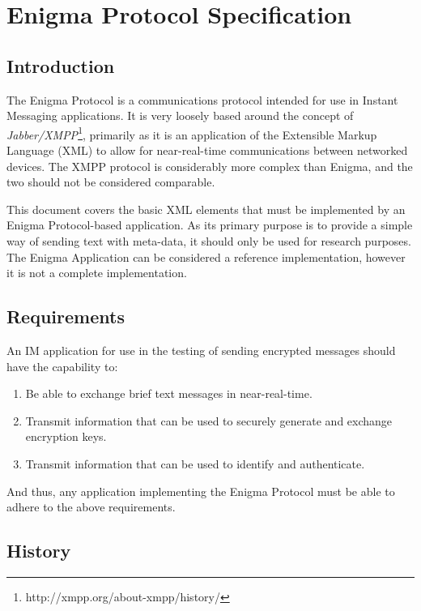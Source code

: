 
\chapter{Enigma Protocol Specification}
\label{AppendixB}

\section{Introduction}

The Enigma Protocol is a communications protocol intended for use in Instant Messaging applications. It is very loosely based around the concept of \emph{Jabber/XMPP}\footnote{http://xmpp.org/about-xmpp/history/}, primarily as it is an application of the Extensible Markup Language (XML) to allow for near-real-time communications between networked devices. The XMPP protocol is considerably more complex than Enigma, and the two should not be considered comparable.

This document covers the basic XML elements that must be implemented by an Enigma Protocol-based application. As its primary purpose is to provide a simple way of sending text with meta-data, it should only be used for research purposes. The Enigma Application can be considered a reference implementation, however it is not a complete implementation.

\section{Requirements}

An IM application for use in the testing of sending encrypted messages should have the capability to:

	\begin{enumerate}
		\item Be able to exchange brief text messages in near-real-time.
		\item Transmit information that can be used to securely generate and exchange encryption keys.
		\item Transmit information that can be used to identify and authenticate.
	\end{enumerate}
	
And thus, any application implementing the Enigma Protocol must be able to adhere to the above requirements.

\section{History}

